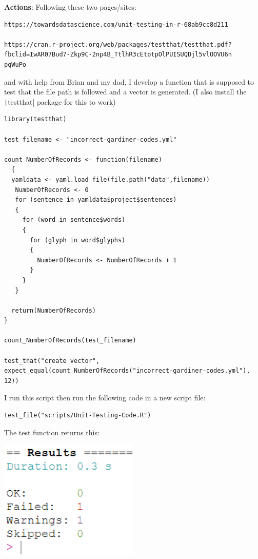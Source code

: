 \documentclass{article}
\begin{document}
\textbf{Actions}: Following these two pages/sites:

\begin{verbatim}
https://towardsdatascience.com/unit-testing-in-r-68ab9cc8d211

https://cran.r-project.org/web/packages/testthat/testthat.pdf?
fbclid=IwAR07Bud7-Zkp9C-2np4B_TtlhR3cEtotpOlPUISUQDjl5vlOOVU6n
pqWuPo
\end{verbatim}

and with help from Brian and my dad, I develop a function that is supposed to test that the file path is followed and a vector is generated. (I also install the \texttt|testthat| package for this to work)

\begin{verbatim}
library(testthat)

test_filename <- "incorrect-gardiner-codes.yml"

count_NumberOfRecords <- function(filename)
  {
  yamldata <- yaml.load_file(file.path("data",filename))
   NumberOfRecords <- 0
   for (sentence in yamldata$project$sentences)
   {
     for (word in sentence$words)
     {
       for (glyph in word$glyphs)
       {
         NumberOfRecords <- NumberOfRecords + 1
       }
     }
   }
   
  return(NumberOfRecords)
}

count_NumberOfRecords(test_filename)

test_that("create vector", expect_equal(count_NumberOfRecords("incorrect-gardiner-codes.yml"), 12))
\end{verbatim}

I run this script then run the following code in a new script file:

\begin{verbatim}
test_file("scripts/Unit-Testing-Code.R")
\end{verbatim}

The test function returns this:

\includegraphics[width=0.5\textwidth]{rstudio_54.PNG}
\end{document}

